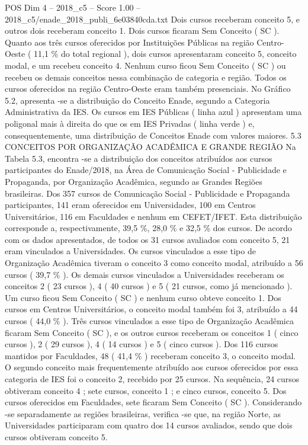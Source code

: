 \begin{textsample}{POS Dim 4 – 2018\_c5 – Score 1.00 – 2018\_c5/enade\_2018\_publi\_6e03840cda.txt}
Dois cursos receberam conceito 5, e outros dois receberam conceito 1.
Dois cursos ficaram Sem Conceito ( SC ).
Quanto aos três cursos oferecidos por Instituições Públicas na região Centro-Oeste ( 11,1 \% do total regional ), dois cursos apresentaram conceito 5, conceito modal, e um recebeu conceito 4.
Nenhum curso ficou Sem Conceito ( SC ) ou recebeu os demais conceitos nessa combinação de categoria e região.
Todos os cursos oferecidos na região Centro-Oeste eram também presenciais.
No Gráfico 5.2, apresenta -se a distribuição do Conceito Enade, segundo a Categoria Administrativa da IES.
Os cursos em IES Públicas ( linha azul ) apresentam uma poligonal mais à direita do que os em IES Privadas ( linha verde ) e, consequentemente, uma distribuição de Conceitos Enade com valores maiores. 5.3 CONCEITOS POR ORGANIZAÇÃO ACADÊMICA E GRANDE REGIÃO Na Tabela 5.3, encontra -se a distribuição dos conceitos atribuídos aos cursos participantes do Enade/2018, na Área de Comunicação Social - Publicidade e Propaganda, por Organização Acadêmica, segundo as Grandes Regiões brasileiras.
Dos 357 cursos de Comunicação Social - Publicidade e Propaganda participantes, 141 eram oferecidos em Universidades, 100 em Centros Universitários, 116 em Faculdades e nenhum em CEFET/IFET.
Esta distribuição corresponde a, respectivamente, 39,5 \%, 28,0 \% e 32,5 \% dos cursos.
De acordo com os dados apresentados, de todos os 31 cursos avaliados com conceito 5, 21 eram vinculados a Universidades.
Os cursos vinculados a esse tipo de Organização Acadêmica tiveram o conceito 3 como conceito modal, atribuído a 56 cursos ( 39,7 \% ).
Os demais cursos vinculados a Universidades receberam os conceitos 2 ( 23 cursos ), 4 ( 40 cursos ) e 5 ( 21 cursos, como já mencionado ).
Um curso ficou Sem Conceito ( SC ) e nenhum curso obteve conceito 1.
Dos cursos em Centros Universitários, o conceito modal também foi 3, atribuído a 44 cursos ( 44,0 \% ).
Três cursos vinculados a esse tipo de Organização Acadêmica ficaram Sem Conceito ( SC ), e os outros cursos receberam os conceitos 1 ( cinco cursos ), 2 ( 29 cursos ), 4 ( 14 cursos ) e 5 ( cinco cursos ).
Dos 116 cursos mantidos por Faculdades, 48 ( 41,4 \% ) receberam conceito 3, o conceito modal.
O segundo conceito mais frequentemente atribuído aos cursos oferecidos por essa categoria de IES foi o conceito 2, recebido por 25 cursos.
Na sequência, 24 cursos obtiveram conceito 4 ; sete cursos, conceito 1 ; e cinco cursos, conceito 5.
Dos cursos oferecidos em Faculdades, sete ficaram Sem Conceito ( SC ).
Considerando -se separadamente as regiões brasileiras, verifica -se que, na região Norte, as Universidades participaram com quatro dos 14 cursos avaliados, sendo que dois cursos obtiveram conceito 5.

\end{textsample}
